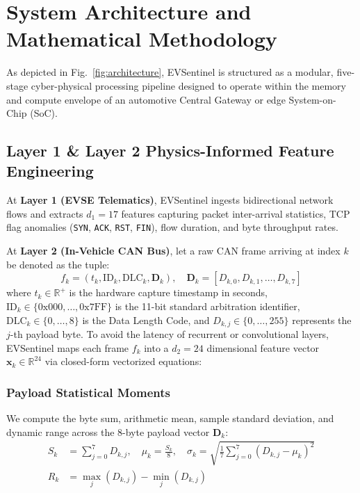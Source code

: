 \documentclass[conference]{IEEEtran}
\begin{document}
\section{System Architecture and Mathematical Methodology}
As depicted in Fig.~\ref{fig:architecture}, EVSentinel is structured as a modular, five-stage cyber-physical processing pipeline designed to operate within the memory and compute envelope of an automotive Central Gateway or edge System-on-Chip (SoC).

\subsection{Layer 1 \& Layer 2 Physics-Informed Feature Engineering}
At \textbf{Layer 1 (EVSE Telematics)}, EVSentinel ingests bidirectional network flows and extracts $d_1 = 17$ features capturing packet inter-arrival statistics, TCP flag anomalies (\texttt{SYN}, \texttt{ACK}, \texttt{RST}, \texttt{FIN}), flow duration, and byte throughput rates.

At \textbf{Layer 2 (In-Vehicle CAN Bus)}, let a raw CAN frame arriving at index $k$ be denoted as the tuple:
\begin{equation}
    f_k = \left( t_k, \text{ID}_k, \text{DLC}_k, \mathbf{D}_k \right), \quad \mathbf{D}_k = \left[ D_{k,0}, D_{k,1}, \dots, D_{k,7} \right]
\end{equation}
where $t_k \in \mathbb{R}^+$ is the hardware capture timestamp in seconds, $\text{ID}_k \in \{0\text{x}000, \dots, 0\text{x}7\text{FF}\}$ is the 11-bit standard arbitration identifier, $\text{DLC}_k \in \{0, \dots, 8\}$ is the Data Length Code, and $D_{k,j} \in \{0, \dots, 255\}$ represents the $j$-th payload byte. To avoid the latency of recurrent or convolutional layers, EVSentinel maps each frame $f_k$ into a $d_2 = 24$ dimensional feature vector $\mathbf{x}_k \in \mathbb{R}^{24}$ via closed-form vectorized equations:

\subsubsection{Payload Statistical Moments}
We compute the byte sum, arithmetic mean, sample standard deviation, and dynamic range across the 8-byte payload vector $\mathbf{D}_k$:
\begin{align}
    S_k &= \sum_{j=0}^{7} D_{k,j}, \quad \mu_k = \frac{S_k}{8}, \quad \sigma_k = \sqrt{\frac{1}{7} \sum_{j=0}^{7} \left(D_{k,j} - \mu_k\right)^2} \\
    R_k &= \max_{j} (D_{k,j}) - \min_{j} (D_{k,j})
\end{align}
\end{document}
